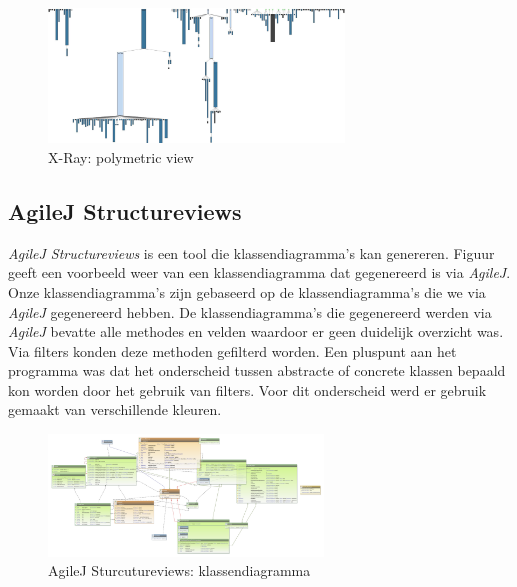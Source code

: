 \documentclass[i1]{oss}
\begin{document}
\begin{figure}[hb!]
	\centering
	\includegraphics[width=0.70\textwidth]{XRayComplexity}
	\caption{X-Ray: polymetric view}
	\label{fig:X-Ray}
\end{figure}

\subsection{AgileJ Structureviews}
\emph{AgileJ Structureviews} is een tool die klassendiagramma's kan genereren. Figuur \label{fig:AgileJklassendia} geeft een voorbeeld weer van een klassendiagramma dat gegenereerd is via \emph{AgileJ}.\\
Onze klassendiagramma's zijn gebaseerd op de klassendiagramma's die we via \emph{AgileJ} gegenereerd hebben. De klassendiagramma's die gegenereerd werden via \emph{AgileJ} bevatte alle methodes en velden waardoor er geen duidelijk overzicht was. Via filters konden deze methoden gefilterd worden. Een pluspunt aan het programma was dat het onderscheid tussen abstracte of concrete klassen bepaald kon worden door het gebruik van filters. Voor dit onderscheid werd er gebruik gemaakt van verschillende kleuren.\\



\begin{figure}[h!]
	\centering
	\includegraphics[width=0.65\textwidth]{AgileJKlassendiagramma}
	\caption{AgileJ Sturcutureviews: klassendiagramma}
	\label{fig:AgileJKlassendia}
\end{figure}
\end{document}
